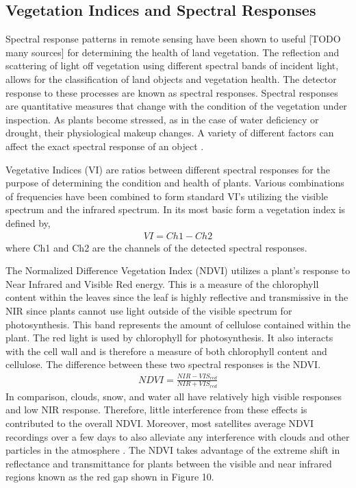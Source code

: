 \subsection{Vegetation Indices and Spectral Responses}
Spectral response patterns in remote sensing have been shown to useful [TODO many sources] for determining the health of land vegetation.  The reflection and scattering of light off vegetation using different spectral bands of incident light, allows for the classification of land objects and vegetation health.  The detector response to these processes are known as spectral responses.  Spectral responses are quantitative measures that change with the condition of the vegetation under inspection.  As plants become stressed, as in the case of water deficiency or drought, their physiological makeup changes.  A variety of different factors can affect the exact spectral response of an object \cite{remotesensing}.

Vegetative Indices (VI) are ratios between different spectral responses for the purpose of determining the condition and health of plants.  Various combinations of frequencies have been combined to form standard VI’s utilizing the visible spectrum and the infrared spectrum. In its most basic form a vegetation index is defined by,
%
\begin{align}
    VI = Ch1 - Ch2
\end{align}
%
where Ch1 and Ch2 are the channels of the detected spectral responses.

The Normalized Difference Vegetation Index (NDVI) utilizes a plant's response to Near Infrared and Visible Red energy.  This is a measure of the chlorophyll content within the leaves since the leaf is highly reflective and transmissive in the NIR since plants cannot use light outside of the visible spectrum for photosynthesis.  This band represents the amount of cellulose contained within the plant.  The red light is used by chlorophyll for photosynthesis.  It also interacts with the cell wall and is therefore a measure of both chlorophyll content and cellulose.  The difference between these two spectral responses is the NDVI.
%
\begin{align}
    NDVI = \frac{NIR - VIS_{red}}{NIR + VIS_{red}}
\end{align}
%
In comparison, clouds, snow, and water all have relatively high visible responses and low NIR response.  Therefore, little interference from these effects is contributed to the overall NDVI.  Moreover, most satellites average NDVI recordings over a few days to also alleviate any interference with clouds and other particles in the atmosphere \cite{remotesensing}.
The NDVI takes advantage of the extreme shift in reflectance and transmittance for plants between the visible and near infrared regions known as the red gap shown in Figure 10.

